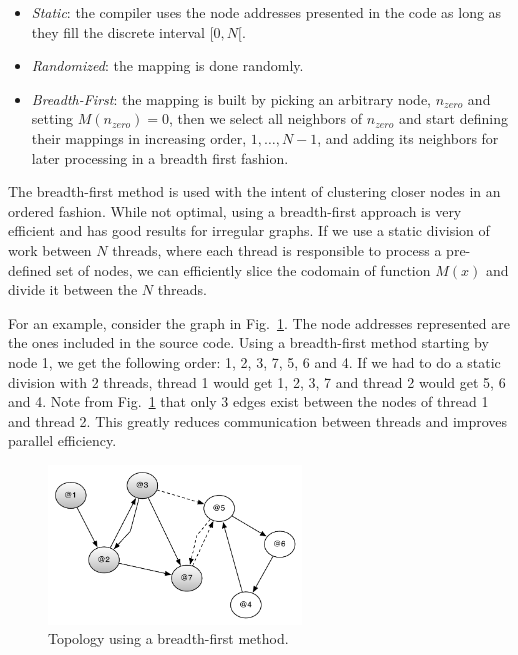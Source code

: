 \begin{itemize}
   \item \emph{Static}: the compiler uses the node addresses presented in the
      code as long as they fill the discrete interval $[0, N[$.
   \item \emph{Randomized}: the mapping is done randomly.
   \item \emph{Breadth-First}: the mapping is built by picking an arbitrary node, $n_{zero}$
   and setting $M(n_{zero}) = 0$, then we select all neighbors of $n_{zero}$ and start defining
   their mappings in increasing order, $1, \dotsc, N-1$, and adding its neighbors for later processing
   in a breadth first fashion.
\end{itemize}

The breadth-first method is used with the intent of clustering closer nodes in
an ordered fashion.  While not optimal, using a breadth-first approach is very
efficient and has good results for irregular graphs. If we use a static division
of work between $N$ threads, where each thread is responsible to process a
pre-defined set of nodes, we can efficiently slice the codomain of function
$M(x)$ and divide it between the $N$ threads.

For an example, consider the graph in Fig.~\ref{fig:compiler:topology1}. The
node addresses represented are the ones included in the source code. Using a
breadth-first method starting by node 1, we get the following order: 1, 2, 3, 7,
5, 6 and 4. If we had to do a static division with 2 threads, thread 1 would get
1, 2, 3, 7 and thread 2 would get 5, 6 and 4. Note from
Fig.~\ref{fig:compiler:topology1} that only 3 edges exist between the nodes of
thread 1 and thread 2. This greatly reduces communication between threads and
improves parallel efficiency.

\begin{figure}[ht]
  \centering
  \includegraphics[width=0.6\textwidth]{figures/compiler/topology1.pdf}
  \caption{Topology using a breadth-first method.}
  \label{fig:compiler:topology1}
\end{figure}
\fi
